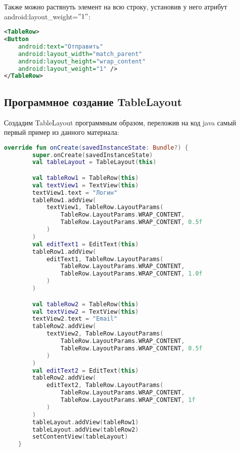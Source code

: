 \img{png10]}{Растягиваем элемент на несколько столбцов в TableLayout в Android}
Также можно растянуть элемент на всю строку, установив у него атрибут
android:layout\_weight=\("1"\):
\begin{lstlisting}[language=xml, caption=\leftline{xml}, label=lst:layout_weight]
<TableRow>
<Button
    android:text="Отправить"
    android:layout_width="match_parent"
    android:layout_height="wrap_content"
    android:layout_weight="1" />
</TableRow>
\end{lstlisting}
\subsection{Программное создание TableLayout}
Создадим TableLayout программным образом, переложив на код java самый
первый пример из данного материала:
\begin{lstlisting}[language=Kotlin, caption=\leftline{Kotlin}, label=lst:Программное создание TableLayout]
override fun onCreate(savedInstanceState: Bundle?) {
        super.onCreate(savedInstanceState)
        val tableLayout = TableLayout(this)

        val tableRow1 = TableRow(this)
        val textView1 = TextView(this)
        textView1.text = "Логин"
        tableRow1.addView(
            textView1, TableRow.LayoutParams(
                TableRow.LayoutParams.WRAP_CONTENT,
                TableRow.LayoutParams.WRAP_CONTENT, 0.5f
            )
        )
        val editText1 = EditText(this)
        tableRow1.addView(
            editText1, TableRow.LayoutParams(
                TableRow.LayoutParams.WRAP_CONTENT,
                TableRow.LayoutParams.WRAP_CONTENT, 1.0f
            )
        )

        val tableRow2 = TableRow(this)
        val textView2 = TextView(this)
        textView2.text = "Email"
        tableRow2.addView(
            textView2, TableRow.LayoutParams(
                TableRow.LayoutParams.WRAP_CONTENT,
                TableRow.LayoutParams.WRAP_CONTENT, 0.5f
            )
        )
        val editText2 = EditText(this)
        tableRow2.addView(
            editText2, TableRow.LayoutParams(
                TableRow.LayoutParams.WRAP_CONTENT,
                TableRow.LayoutParams.WRAP_CONTENT, 1f
            )
        )
        tableLayout.addView(tableRow1)
        tableLayout.addView(tableRow2)
        setContentView(tableLayout)
    }
\end{lstlisting}

